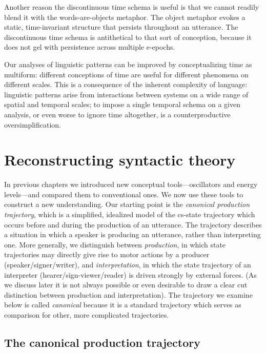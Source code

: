   Another reason the discontinuous time schema is useful is that we cannot readily blend it with the words-are-objects metaphor. The object metaphor evokes a static, time-invariant structure that persists throughout an utterance. The discontinuous time schema is antithetical to that sort of conception, because it does not gel with persistence across multiple e-epochs. 

  Our analyses of linguistic patterns can be improved by conceptualizing time as multiform: different conceptions of time are useful for different phenomena on different scales. This is a consequence of the inherent complexity of language: linguistic patterns arise from interactions between systems on a wide range of spatial and temporal scales; to impose a single temporal schema on a given analysis, or even worse to ignore time altogether, is a counterproductive oversimplification. 

\chapter{Reconstructing syntactic theory}

In previous chapters we introduced new conceptual tools—oscillators and energy levels—and compared them to conventional ones. We now use these tools to construct a new understanding. Our starting point is the \textit{canonical production trajectory}, which is a simplified, idealized model of the cs-state trajectory which occurs before and during the production of an utterance. The trajectory describes a situation in which a speaker is producing an utterance, rather than interpreting one. More generally, we distinguish between \textit{production}, in which state trajectories may directly give rise to motor actions by a producer (speaker/signer/writer), and \textit{interpretation}, in which the state trajectory of an interpreter (hearer/sign-viewer/reader) is driven strongly by external forces. (As we discuss later it is not always possible or even desirable to draw a clear cut distinction between production and interpretation). The trajectory we examine below is called \textit{canonical} because it is a standard trajectory which serves as comparison for other, more complicated trajectories.

\section{The canonical production trajectory}

